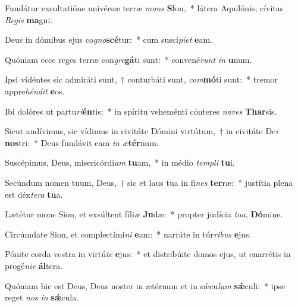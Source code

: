 \item Fundátur exsultatióne univérsæ terræ \textit{mons} \textbf{Si}on,~* látera Aquilónis, cívitas \textit{Re}\textit{gis} \textbf{ma}gni.
\item Deus in dómibus ejus co\textit{gno}\textbf{scé}tur:~* cum suscí\textit{pi}\textit{et} \textbf{e}am.
\item Quóniam ecce reges terræ con\textit{gre}\textbf{gá}ti sunt:~* convené\textit{runt} \textit{in} \textbf{u}num.
\item Ipsi vidéntes sic admiráti sunt,~† conturbáti sunt, \textit{com}\textbf{mó}ti sunt:~* tremor appre\textit{hén}\textit{dit} \textbf{e}os.
\item Ibi dolóres ut partu\textit{ri}\textbf{én}tis:~* in spíritu veheménti cónteres \textit{na}\textit{ves} \textbf{Thar}sis.
\item Sicut audívimus, sic vídimus in civitáte Dómini virtútum,~† in civitáte De\textit{i} \textbf{nos}tri:~* Deus fundávit eam \textit{in} \textit{æ}\textbf{tér}num.
\item Suscépimus, Deus, misericórdi\textit{am} \textbf{tu}am,~* in médio \textit{tem}\textit{pli} \textbf{tu}i.
\item Secúndum nomen tuum, Deus,~† sic et laus tua in fi\textit{nes} \textbf{ter}ræ:~* justítia plena est déx\textit{te}\textit{ra} \textbf{tu}a.
\item Lætétur mons Sion, et exsúltent fíli\textit{æ} \textbf{Ju}dæ:~* propter judícia \textit{tu}\textit{a}, \textbf{Dó}mine.
\item Circúmdate Sion, et complectími\textit{ni} \textbf{e}am:~* narráte in túr\textit{ri}\textit{bus} \textbf{e}jus.
\item Pónite corda vestra in virtú\textit{te} \textbf{e}jus:~* et distribúite domos ejus, ut enarrétis in progé\textit{ni}\textit{e} \textbf{ál}tera.
\item Quóniam hic est Deus, Deus noster in ætérnum et in sǽcu\textit{lum} \textbf{sǽ}culi:~* ipse reget \textit{nos} \textit{in} \textbf{sǽ}cula.
